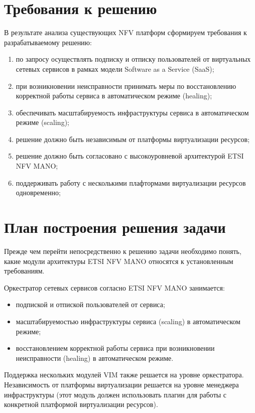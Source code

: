 \documentclass[oneside,final,14pt,a4paper]{extreport}
\begin{document}
\section{Требования к решению}
\label{sec:platform_requirements}
В результате анализа существующих NFV платформ сформируем требования к разрабатываемому решению:
\begin{enumerate}
	\item по запросу осуществлять подписку и отписку пользователей от виртуальных сетевых сервисов в рамках модели Software as a Service (SaaS);
	\item при возникновении неисправности принимать меры по восстановлению корректной работы сервиса в автоматическом режиме (healing);
	\item обеспечивать масштабируемость инфраструктуры сервиса в автоматическом режиме (scaling);
	\item решение должно быть независимым от платформы виртуализации ресурсов;
	\item решение должно быть согласовано с высокоуровневой архитектурой ETSI NFV MANO;
	\item поддерживать работу с несколькими плафтормами виртуализации ресурсов одновременно;
\end{enumerate}


\section{План построения решения задачи}
Прежде чем перейти непосредственно к решению задачи необходимо понять, какие модули архитектуры ETSI NFV MANO относятся к установленным требованиям.

Оркестратор сетевых сервисов согласно ETSI NFV MANO занимается:
\begin{itemize}
	\item подпиской и отпиской пользователей от сервиса;
	\item масштабируемостью инфраструктуры сервиса (scaling) в автоматическом режиме;
	\item восстановлением корректной работы сервиса при возникновении неисправности (healing) в автоматическом режиме.
\end{itemize}

Поддержка нескольких модулей VIM также решается на уровне оркестратора. Независимость от платформы виртуализации решается на уровне менеджера инфраструктуры (этот модуль должен использовать плагин для работы с конкретной платформой виртуализации ресурсов).
\end{document}
